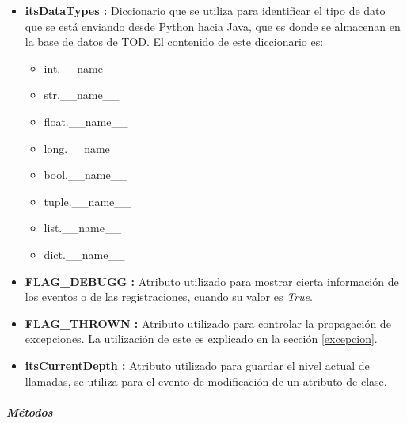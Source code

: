 \documentclass[12pt,legalpaper]{report}
\begin{document}
\begin{itemize}
	\item \textbf{itsDataTypes :} Diccionario que se utiliza para identificar el tipo de dato que se está enviando desde Python hacia Java, que es donde se almacenan en la base de datos de TOD.  El contenido de este diccionario es:
	\begin{itemize}
		\item int.\_\_name\_\_
		\item str.\_\_name\_\_
		\item float.\_\_name\_\_
		\item long.\_\_name\_\_
		\item bool.\_\_name\_\_
		\item tuple.\_\_name\_\_
		\item list.\_\_name\_\_
		\item dict.\_\_name\_\_
	\end{itemize}
	
	\item \textbf{FLAG\_DEBUGG :} Atributo utilizado para mostrar cierta información de los eventos o de las registraciones, cuando su valor es \textit{True}.
	
	\item \textbf{FLAG\_THROWN :} Atributo utilizado para controlar la propagación de excepciones.  La utilización de este es explicado en la sección \ref{excepcion}.
	
	\item \textbf{itsCurrentDepth :} Atributo utilizado para guardar el nivel actual de llamadas, se utiliza para el evento de modificación de un atributo de clase.
\end{itemize}			
					
					\subparagraph{Métodos}
					
\end{document}

